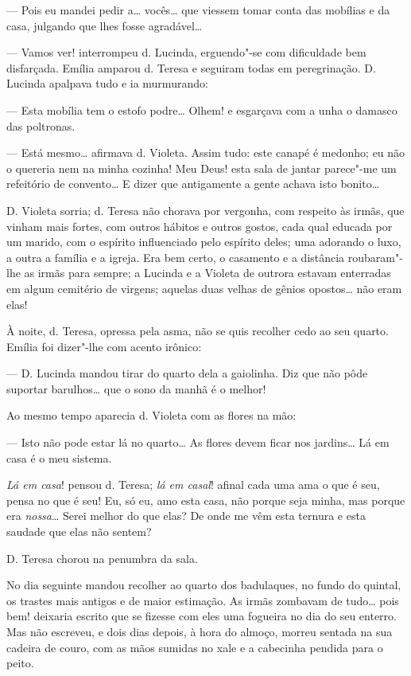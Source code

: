 --- Pois eu mandei pedir a\ldots{} vocês\ldots{} que viessem tomar conta das
mobílias e da casa, julgando que lhes fosse agradável\ldots{}

--- Vamos ver! interrompeu d. Lucinda, erguendo"-se com dificuldade bem
disfarçada. Emília amparou d. Teresa e seguiram todas em peregrinação.
D. Lucinda apalpava tudo e ia murmurando:

--- Esta mobília tem o estofo podre\ldots{} Olhem! e esgarçava com a unha o
damasco das poltronas.

--- Está mesmo\ldots{} afirmava d. Violeta. Assim tudo: este canapé é
medonho; eu não o quereria nem na minha cozinha! Meu Deus! esta sala de
jantar parece"-me um refeitório de convento\ldots{} E dizer que antigamente a
gente achava isto bonito\ldots{}

D. Violeta sorria; d. Teresa não chorava por vergonha, com respeito às
irmãs, que vinham mais fortes, com outros hábitos e outros gostos, cada
qual educada por um marido, com o espírito influenciado pelo espírito
deles; uma adorando o luxo, a outra a família e a igreja. Era bem certo,
o casamento e a distância roubaram"-lhe as irmãs para sempre; a Lucinda e
a Violeta de outrora estavam enterradas em algum cemitério de virgens;
aquelas duas velhas de gênios opostos\ldots{} não eram elas!

À noite, d. Teresa, opressa pela asma, não se quis recolher cedo ao seu
quarto. Emília foi dizer"-lhe com acento irônico:

--- D. Lucinda mandou tirar do quarto dela a gaiolinha. Diz que não pôde
suportar barulhos\ldots{} que o sono da manhã é o melhor!

Ao mesmo tempo aparecia d. Violeta com as flores na mão:

--- Isto não pode estar lá no quarto\ldots{} As flores devem ficar nos
jardins\ldots{} Lá em casa é o meu sistema.

\emph{Lá em casa}! pensou d. Teresa; \emph{lá em casal}! afinal cada uma
ama o que é seu, pensa no que é seu! Eu, só eu, amo esta casa, não
porque seja minha, mas porque era \emph{nossa}\ldots{} Serei melhor do que
elas? De onde me vêm esta ternura e esta saudade que elas não sentem?

D. Teresa chorou na penumbra da sala.

No dia seguinte mandou recolher ao quarto dos badulaques, no fundo do
quintal, os trastes mais antigos e de maior estimação. As irmãs zombavam
de tudo\ldots{} pois bem! deixaria escrito que se fizesse com eles uma
fogueira no dia do seu enterro. Mas não escreveu, e dois dias depois, à
hora do almoço, morreu sentada na sua cadeira de couro, com as mãos
sumidas no xale e a cabecinha pendida para o peito.

